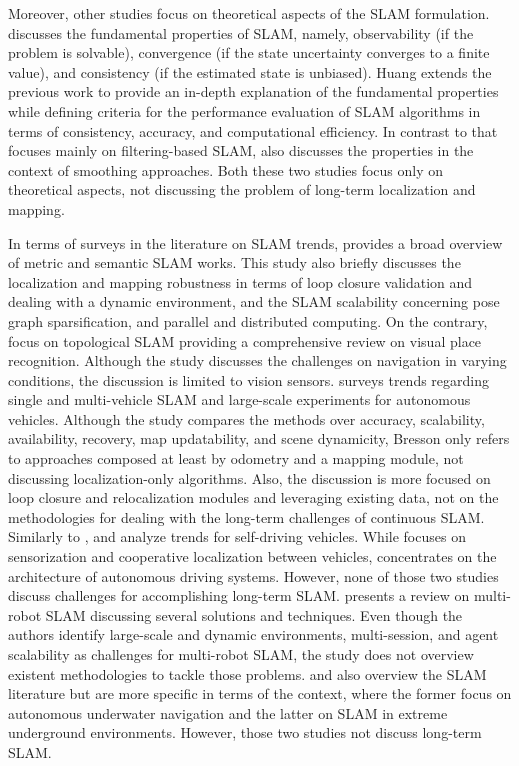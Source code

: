 Moreover, other studies focus on theoretical aspects of the SLAM formulation. \cite{purpose:study:dissanayake:2011} discusses the fundamental properties of SLAM, namely, observability (if the problem is solvable), convergence (if the state uncertainty converges to a finite value), and consistency (if the estimated state is unbiased). Huang extends the previous work to provide an in-depth explanation of the fundamental properties while defining criteria for the performance evaluation of SLAM algorithms in terms of consistency, accuracy, and computational efficiency. In contrast to \cite{purpose:study:dissanayake:2011} that focuses mainly on filtering-based SLAM, \cite{purpose:study:huang-dissanayake:2016} also discusses the properties in the context of smoothing approaches. Both these two studies focus only on theoretical aspects, not discussing the problem of long-term localization and mapping.

In terms of surveys in the literature on SLAM trends, \cite{purpose:study:cadena:2016} provides a broad overview of metric and semantic SLAM works. This study also briefly discusses the localization and mapping robustness in terms of loop closure validation and dealing with a dynamic environment, and the SLAM scalability concerning pose graph sparsification, and parallel and distributed computing. On the contrary, \cite{purpose:study:lowry:2016} focus on topological SLAM providing a comprehensive review on visual place recognition. Although the study discusses the challenges on navigation in varying conditions, the discussion is limited to vision sensors.
\cite{purpose:study:bresson:2017} surveys trends regarding single and multi-vehicle SLAM and large-scale experiments for autonomous vehicles. Although the study compares the methods over accuracy, scalability, availability, recovery, map updatability, and scene dynamicity, Bresson only refers to approaches composed at least by odometry and a mapping module, not discussing localization-only algorithms. Also, the discussion is more focused on loop closure and relocalization modules and leveraging existing data, not on the methodologies for dealing with the long-term challenges of continuous SLAM.
Similarly to \cite{purpose:study:bresson:2017}, \cite{purpose:study:kuutti:2018} and \cite{purpose:study:badue:2021} analyze trends for self-driving vehicles. While \cite{purpose:study:kuutti:2018} focuses on sensorization and cooperative localization between vehicles, \cite{purpose:study:badue:2021} concentrates on the architecture of autonomous driving systems. However, none of those two studies discuss challenges for accomplishing long-term SLAM.
\cite{purpose:study:saeedi:2016} presents a review on multi-robot SLAM discussing several solutions and techniques. Even though the authors identify large-scale and dynamic environments, multi-session, and agent scalability as challenges for multi-robot SLAM, the study does not overview existent methodologies to tackle those problems.
\cite{purpose:study:paull:2014} and \cite{purpose:study:ebadi} also overview the SLAM literature but are more specific in terms of the context, where the former focus on autonomous underwater navigation and the latter on SLAM in extreme underground environments. However, those two studies not discuss long-term SLAM.

